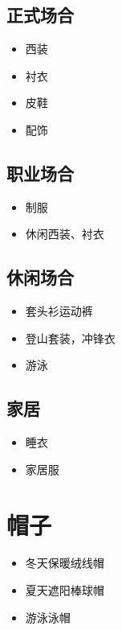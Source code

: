 \documentclass[
  letterpaper,
  DIV=11,
  numbers=noendperiod]{scrreprt}
\providecommand{\tightlist}{%
  \setlength{\itemsep}{0pt}\setlength{\parskip}{0pt}}\usepackage{longtable,booktabs,array}
\begin{document}
\subsection{正式场合}\label{ux6b63ux5f0fux573aux5408}

\begin{itemize}
\tightlist
\item
  西装
\item
  衬衣
\item
  皮鞋
\item
  配饰
\end{itemize}

\subsection{职业场合}\label{ux804cux4e1aux573aux5408}

\begin{itemize}
\tightlist
\item
  制服
\item
  休闲西装、衬衣
\end{itemize}

\subsection{休闲场合}\label{ux4f11ux95f2ux573aux5408}

\begin{itemize}
\tightlist
\item
  套头衫运动裤
\item
  登山套装，冲锋衣
\item
  游泳
\end{itemize}

\subsection{家居}\label{ux5bb6ux5c45}

\begin{itemize}
\tightlist
\item
  睡衣
\item
  家居服
\end{itemize}

\section{帽子}\label{ux5e3dux5b50}

\begin{itemize}
\tightlist
\item
  冬天保暖绒线帽
\item
  夏天遮阳棒球帽
\item
  游泳泳帽
\end{itemize}
\end{document}
